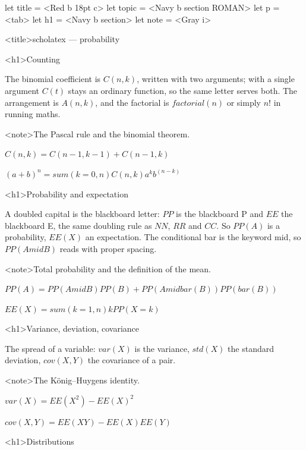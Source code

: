 \documentclass[
  margins=24,
  font=Latin Modern Roman,
  size=12,
  linespread=1.4,
  lang=en
]{scholatex}
\begin{document}
let title = <Red b 18pt c>
let topic = <Navy b section ROMAN>
let p     = <tab>
let h1    = <Navy b section>
let note  = <Gray i>

<title>scholatex — probability

<h1>Counting

The binomial coefficient is $C(n, k)$, written with two arguments; with a
single argument $C(t)$ stays an ordinary function, so the same letter serves
both. The arrangement is $A(n, k)$, and the factorial is $factorial(n)$ or
simply $n!$ in running maths.

<note>The Pascal rule and the binomial theorem.

$C(n, k) = C(n-1, k-1) + C(n-1, k)$

$(a + b)^n = sum(k=0,n) C(n, k) a^k b^(n-k)$

<h1>Probability and expectation

A doubled capital is the blackboard letter: $PP$ is the blackboard P and
$EE$ the blackboard E, the same doubling rule as $NN$, $RR$ and $CC$. So
$PP(A)$ is a probability, $EE(X)$ an expectation. The conditional bar is the
keyword mid, so $PP(A mid B)$ reads with proper spacing.

<note>Total probability and the definition of the mean.

$PP(A) = PP(A mid B) PP(B) + PP(A mid bar(B)) PP(bar(B))$

$EE(X) = sum(k=1,n) k PP(X = k)$

<h1>Variance, deviation, covariance

The spread of a variable: $var(X)$ is the variance, $std(X)$ the standard
deviation, $cov(X, Y)$ the covariance of a pair.

<note>The König–Huygens identity.

$var(X) = EE(X^2) - EE(X)^2$

$cov(X, Y) = EE(X Y) - EE(X) EE(Y)$

<h1>Distributions
\end{document}
